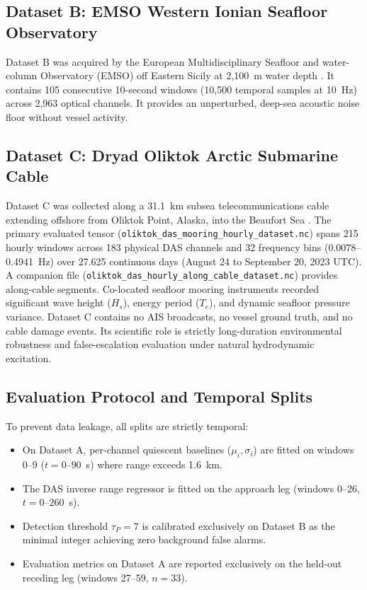 \documentclass[conference]{IEEEtran}
\begin{document}
\subsection{Dataset B: EMSO Western Ionian Seafloor Observatory}
Dataset B was acquired by the European Multidisciplinary Seafloor and
water-column Observatory (EMSO) off Eastern Sicily at 2,100~m water depth
\cite{b11}. It contains 105 consecutive 10-second windows (10,500 temporal
samples at 10~Hz) across 2,963 optical channels. It provides an unperturbed,
deep-sea acoustic noise floor without vessel activity.

\subsection{Dataset C: Dryad Oliktok Arctic Submarine Cable}
Dataset C was collected along a 31.1~km subsea telecommunications cable
extending offshore from Oliktok Point, Alaska, into the Beaufort Sea
\cite{b15}. The primary evaluated tensor
(\texttt{oliktok\_das\_mooring\_hourly\_dataset.nc}) spans 215 hourly windows
across 183 physical DAS channels and 32 frequency bins (0.0078--0.4941~Hz) over
27.625 continuous days (August 24 to September 20, 2023 UTC). A companion
file (\texttt{oliktok\_das\_hourly\_along\_cable\_dataset.nc}) provides along-cable
segments. Co-located seafloor mooring instruments recorded significant wave
height ($H_s$), energy period ($T_e$), and dynamic seafloor pressure variance.
Dataset C contains no AIS broadcasts, no vessel ground truth, and no cable damage
events. Its scientific role is strictly long-duration environmental robustness
and false-escalation evaluation under natural hydrodynamic excitation.

\subsection{Evaluation Protocol and Temporal Splits}
\label{sec:protocol}
To prevent data leakage, all splits are strictly temporal:
\begin{itemize}
\item On Dataset A, per-channel quiescent baselines ($\mu_i, \sigma_i$) are
fitted on windows 0--9 ($t=0$--$90$~s) where range exceeds 1.6~km.
\item The DAS inverse range regressor is fitted on the approach leg (windows
0--26, $t=0$--$260$~s).
\item Detection threshold $\tau_P = 7$ is calibrated exclusively on Dataset B
as the minimal integer achieving zero background false alarms.
\item Evaluation metrics on Dataset A are reported exclusively on the held-out
receding leg (windows 27--59, $n=33$).
\end{itemize}
\end{document}
